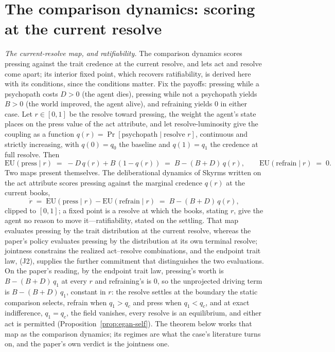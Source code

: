 \section{The comparison dynamics: scoring at the current resolve}
\label{sec:comeapart}
\noindent\textit{The current-resolve map, and ratifiability.} The comparison dynamics scores pressing against the trait credence at the current resolve, and lets act and resolve come apart; its interior fixed point, which recovers ratifiability, is derived here with its conditions, since the conditions matter. Fix the payoffs: pressing while a psychopath costs $D > 0$ (the agent dies), pressing while not a psychopath yields $B > 0$ (the world improved, the agent alive), and refraining yields $0$ in either case. Let $r \in [0,1]$ be the resolve toward pressing, the weight the agent's state places on the press value of the act attribute, and let resolve-luminosity give the coupling as a function $q(r) = \Pr[\text{psychopath} \mid \text{resolve } r]$, continuous and strictly increasing, with $q(0) = q_0$ the baseline and $q(1) = q_1$ the credence at full resolve. Then
\begin{equation}
\label{eq:egan-eu}
\mathrm{EU}(\text{press} \mid r) \;=\; -D\,q(r) + B\,(1 - q(r)) \;=\; B - (B + D)\,q(r), \qquad \mathrm{EU}(\text{refrain} \mid r) \;=\; 0 .
\end{equation}
Two maps present themselves. The deliberational dynamics of Skyrms \cite{skyrms1990dynamics} written on the act attribute scores pressing against the marginal credence $q(r)$ at the current books,
\begin{equation}
\label{eq:egan-map}
\dot{r} \;=\; \mathrm{EU}(\text{press} \mid r) - \mathrm{EU}(\text{refrain} \mid r) \;=\; B - (B + D)\,q(r),
\end{equation}
clipped to $[0,1]$; a fixed point is a resolve at which the books, stating $r$, give the agent no reason to move it---ratifiability, stated on the settling. That map evaluates pressing by the trait distribution at the current resolve, whereas the paper's policy evaluates pressing by the distribution at its own terminal resolve; jointness constrains the realized act--resolve combinations, and the endpoint trait law, (J2), supplies the further commitment that distinguishes the two evaluations. On the paper's reading, by the endpoint trait law, pressing's worth is $B - (B+D)\,q_1$ at every $r$ and refraining's is $0$, so the unprojected driving term is $B - (B+D)\,q_1$, constant in $r$: the resolve settles at the boundary the static comparison selects, refrain when $q_1 > q_c$ and press when $q_1 < q_c$, and at exact indifference, $q_1 = q_c$, the field vanishes, every resolve is an equilibrium, and either act is permitted (Proposition~\ref{prop:egan-self}). The theorem below works that map as the comparison dynamics; its regimes are what the case's literature turns on, and the paper's own verdict is the jointness one.
